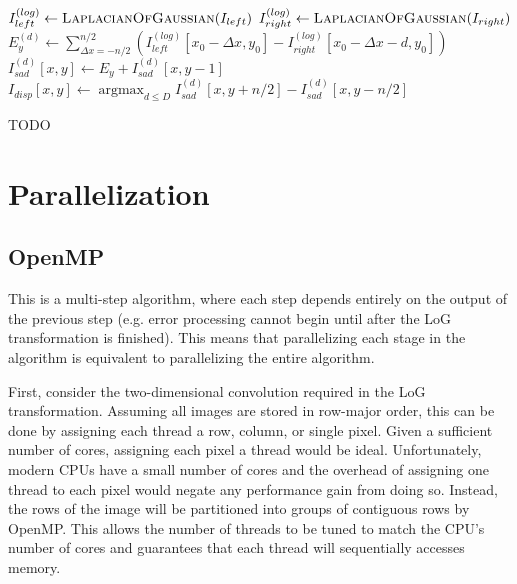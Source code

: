 \documentclass{article}
\newcommand{\proc}[1]{\textnormal{\scshape#1}}
\DeclareMathOperator*{\argmin}{argmax}
\DeclareMathOperator{\LoG}{\proc{LaplacianOfGaussian}}
\begin{document}
\begin{algorithm}
    $I_{left}^{(log)} \gets \LoG(I_{left})$   \;
    $I_{right}^{(log)} \gets \LoG(I_{right})$ \;
     {
         {
            $E_y^{(d)} \gets \sum_{\Delta x = -n/2}^{n/2} \left(
                          I_{left}^{(log)}[x_0 - \Delta x, y_0]
                          - I_{right}^{(log)}[x_0 - \Delta x - d, y_0] \right)$ \;
            $I_{sad}^{(d)}[x, y] \gets E_y + I_{sad}^{(d)}[x, y - 1]$ \;
        }
    }
     {
        $I_{disp}[x, y] \gets \argmin_{d \le D} I_{sad}^{(d)}[x, y + n/2] - I_{sad}^{(d)}[x, y - n/2]$ \;
    }
    \caption{
        TODO
    }
    \label{alg:serial}
\end{algorithm}

\section{Parallelization}
\label{sec:parallel}

\subsection{OpenMP}
\label{sec:parallel-omp}
This is a multi-step algorithm, where each step depends entirely on the output
of the previous step (e.g. error processing cannot begin until after the LoG
transformation is finished). This means that parallelizing each stage in the
algorithm is equivalent to parallelizing the entire algorithm.

First, consider the two-dimensional convolution required in the LoG
transformation. Assuming all images are stored in row-major order, this can be
done by assigning each thread a row, column, or single pixel. Given a
sufficient number of cores, assigning each pixel a thread would be ideal.
Unfortunately, modern CPUs have a small number of cores and the overhead of
assigning one thread to each pixel would negate any performance gain from doing
so. Instead, the rows of the image will be partitioned into groups of
contiguous rows by OpenMP. This allows the number of threads to be tuned to
match the CPU's number of cores and guarantees that each thread will
sequentially accesses memory.
\end{document}
